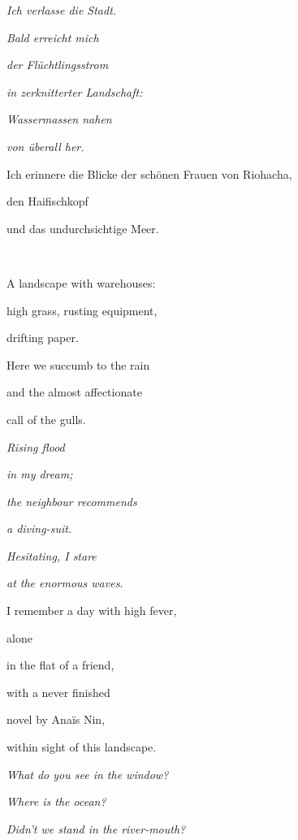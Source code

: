 \bigskip

\emph{
Ich verlasse die Stadt.}

\emph{
Bald erreicht mich }

\emph{
der Flüchtlingsstrom}

\emph{
in zerknitterter Landschaft:}

\emph{
Wassermassen nahen }

\emph{
von überall her.}


\bigskip

Ich erinnere die Blicke der schönen Frauen von Riohacha,

den Haifischkopf

und das undurchsichtige Meer.

~



\bigskip

A landscape with warehouses:

high grass, rusting equipment,

drifting paper.


\bigskip

Here we succumb to the rain 

and the almost affectionate 

call of the gulls.


\bigskip

\emph{
Rising flood}

\emph{
in my dream;}

\emph{
the neighbour recommends}

\emph{
a diving-suit.}

\emph{
Hesitating, I stare}

\emph{
at the enormous waves.}


\bigskip

I remember a day with high fever,

alone

in the flat of a friend,


\bigskip

with a never finished

novel by Anaïs Nin,

within sight of this landscape.


\bigskip

\emph{
What do you see in the window?}

\emph{
Where is the ocean?}

\emph{
Didn't we stand in the river-mouth?}

